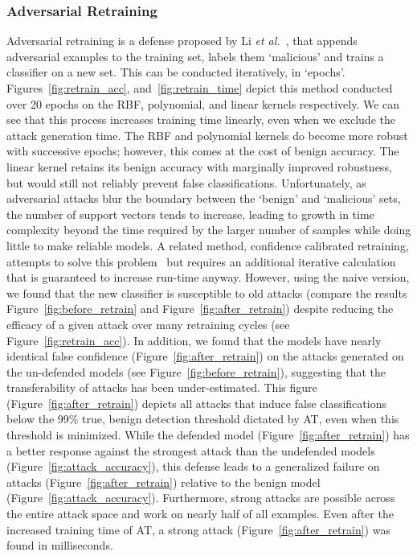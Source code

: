 \documentclass[fonts]{icst}
\begin{document}
\subsubsection{Adversarial Retraining}
Adversarial retraining is a defense proposed by  Li \textit{et al.}~\cite{li2016general}, that appends adversarial examples to the training set, labels them `malicious' and trains a classifier on a new set.
This can be conducted iteratively, in `epochs'.
Figures~\ref{fig:retrain_acc}, and~\ref{fig:retrain_time} depict this method conducted over 20 epochs on the RBF, polynomial, and linear kernels respectively.
We can see that this process increases training time linearly, even when we exclude the attack generation time.
The RBF and polynomial kernels do become more robust with successive epochs; however, this comes at the cost of benign accuracy.
The linear kernel retains its benign accuracy with marginally improved robustness, but would still not reliably prevent false classifications.
Unfortunately, as adversarial attacks blur the boundary between the `benign' and `malicious' sets, the number of support vectors tends to increase, leading to growth in time complexity beyond the time required by the larger number of samples while doing little to make reliable models.
A related method, confidence calibrated retraining, attempts to solve this problem~\cite{croce2020reliable} but requires an additional iterative calculation that is guaranteed to increase run-time anyway.
However, using the naive version, we found that the new classifier is susceptible to old attacks (compare the results Figure~\ref{fig:before_retrain} and Figure~\ref{fig:after_retrain}) despite reducing the efficacy of a given attack over many retraining cycles (see Figure~\ref{fig:retrain_acc}).
In addition, we found that the models have nearly identical false confidence (Figure~\ref{fig:after_retrain}) on the attacks generated on the un-defended models (see Figure~\ref{fig:before_retrain}), suggesting that the transferability of attacks has been under-estimated.
This figure (Figure~\ref{fig:after_retrain}) depicts all attacks that induce false classifications below the 99\% true, benign detection threshold dictated by AT, even when this threshold is minimized.
While the defended model (Figure~\ref{fig:after_retrain}) has a better response against the strongest attack  than the undefended models (Figure~\ref{fig:attack_accuracy}), this defense leads to a generalized failure on attacks (Figure~\ref{fig:after_retrain}) relative to the benign model (Figure~\ref{fig:attack_accuracy}).
Furthermore, strong attacks are possible across the entire attack space and work on nearly half of all examples.
Even after the increased training time of AT, a strong attack  (Figure~\ref{fig:after_retrain}) was found in milliseconds.
\end{document}

